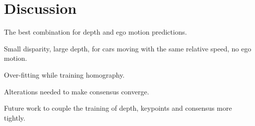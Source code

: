 \chapter{Discussion}\label{cha:discussion}

The best combination for depth and ego motion predictions.

Small disparity, large depth, for cars moving with the same relative speed, no ego motion.

Over-fitting while training homography.

Alterations needed to make consensus converge.

Future work to couple the training of depth, keypoints and consensus more tightly.